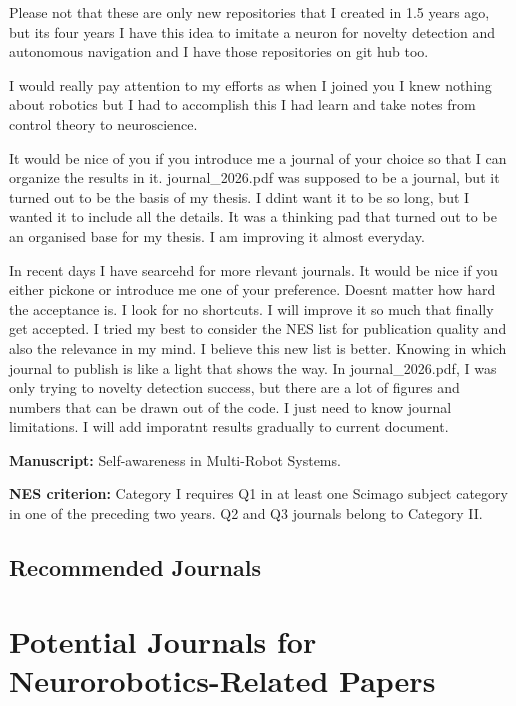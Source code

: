 \documentclass[a4paper]{article}
\begin{document}
   Please not that these are only new repositories that I created in 1.5 years ago, but its four years I have this idea to imitate a neuron for novelty detection and autonomous navigation and I have those repositories on git hub too.

   I would really pay attention to my efforts as when I joined you I knew nothing about robotics but I had to accomplish this I had learn and take notes from control theory to neuroscience.

   It would be nice of you if you introduce me a journal of your choice so that I can organize the results in it. journal\_2026.pdf was supposed to be a journal, but it turned out to be the basis of my thesis. I ddint want it to be so long, but I wanted it to include all the details. It was a thinking pad that turned out to be an organised base for my thesis. I am improving it almost everyday.

   In recent days I have searcehd for more rlevant journals. It would be nice if you either pickone or introduce me one of your preference. Doesnt matter how hard the acceptance is. I look for no shortcuts. I will improve it so much that finally get accepted. I tried my best to consider the NES list for publication quality and also the relevance in my mind. I believe this new list is better.  Knowing in which journal to publish is like a light that shows the way. In journal\_2026.pdf, I was only trying to novelty detection success, but there are a lot of figures and numbers that can be drawn out of the code. I just need to know journal limitations. I will add imporatnt results gradually to current document.


   \textbf{Manuscript:} Self-awareness in Multi-Robot Systems.

   \textbf{NES criterion:} Category I requires Q1 in at least one
   Scimago subject category in one of the preceding two years.
   Q2 and Q3 journals belong to Category II.

      \subsection{Recommended Journals}


   \section{Potential Journals for Neurorobotics-Related Papers}

      \begingroup
      \scriptsize
      \renewcommand{\arraystretch}{1.2}
      \setlength{\tabcolsep}{4pt}
\end{document}
